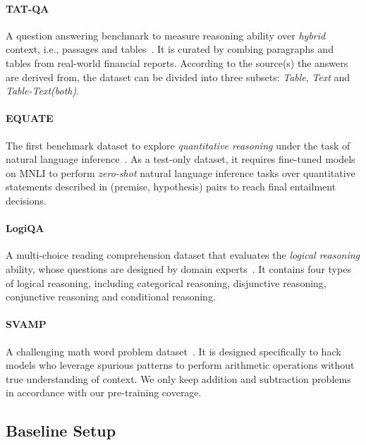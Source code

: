 \paragraph{TAT-QA} A question answering benchmark to measure reasoning ability over \textit{hybrid} context, i.e., passages and tables~\cite{zhu-etal-2021-tat}.
It is curated by combing paragraphs and tables from real-world financial reports.
According to the source(s) the answers are derived from, the dataset can be divided into three subsets: \textit{Table}, \textit{Text} and \textit{Table-Text(both)}.

\paragraph{EQUATE} The first benchmark dataset to explore \textit{quantitative reasoning} under the task of natural language inference~\cite{ravichander-etal-2019-equate}.
As a test-only dataset, it requires fine-tuned models on MNLI to perform \textit{zero-shot} natural language inference tasks over quantitative statements described in (premise, hypothesis) pairs to reach final entailment decisions.

\paragraph{LogiQA} A multi-choice reading comprehension dataset that evaluates the \textit{logical reasoning} ability, whose questions are designed by domain experts~\cite{ijcai2020-501}.
It contains four types of logical reasoning, including categorical reasoning, disjunctive reasoning, conjunctive reasoning and conditional reasoning.


\paragraph{SVAMP} A challenging math word problem dataset~\cite{patel-etal-2021-nlp}. 
It is designed specifically to hack models who leverage spurious patterns to perform arithmetic operations without true understanding of context.
We only keep addition and subtraction problems in accordance with our pre-training coverage.

\subsection{Baseline Setup}

